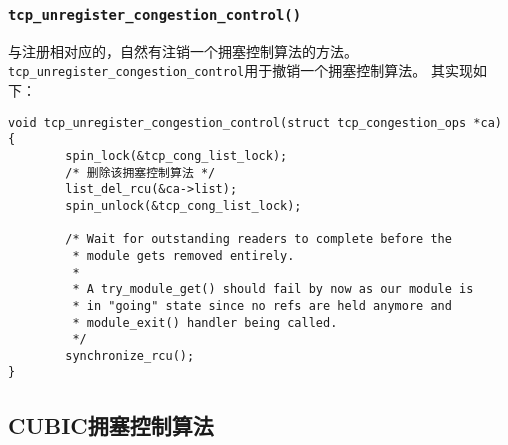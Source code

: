 \subsubsection{\texttt{tcp_unregister_congestion_control()}}
与注册相对应的，自然有注销一个拥塞控制算法的方法。
\texttt{tcp_unregister_congestion_control}用于撤销一个拥塞控制算法。
其实现如下：
\begin{verbatim}
void tcp_unregister_congestion_control(struct tcp_congestion_ops *ca)
{
        spin_lock(&tcp_cong_list_lock);
        /* 删除该拥塞控制算法 */
        list_del_rcu(&ca->list);
        spin_unlock(&tcp_cong_list_lock);

        /* Wait for outstanding readers to complete before the
         * module gets removed entirely.
         *
         * A try_module_get() should fail by now as our module is
         * in "going" state since no refs are held anymore and
         * module_exit() handler being called.
         */
        synchronize_rcu();
}
\end{verbatim}

\subsection{CUBIC拥塞控制算法}
